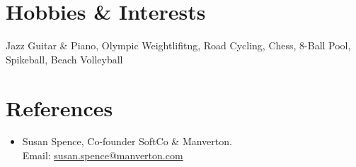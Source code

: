 \documentclass[letterpaper,11pt]{article}
\newcommand{\resumeSubHeadingListStart}{\begin{itemize}[leftmargin=0.15in, label={}]}
\newcommand{\resumeSubHeadingListEnd}{\end{itemize}}
\begin{document}






  \section{Hobbies \& Interests}
  \resumeSubHeadingListStart
  \small{\item{Jazz Guitar \& Piano, Olympic Weightlifitng, Road Cycling, Chess, 8-Ball Pool, Spikeball, Beach Volleyball}}
  \resumeSubHeadingListEnd



\section{References}
  \vspace{2pt}

  
  \resumeSubHeadingListStart
  \item{Susan Spence, Co-founder SoftCo \& Manverton. \\ Email: \href{susan.spence@manverton.com}{susan.spence@manverton.com}}
   \resumeSubHeadingListEnd




\end{document}
